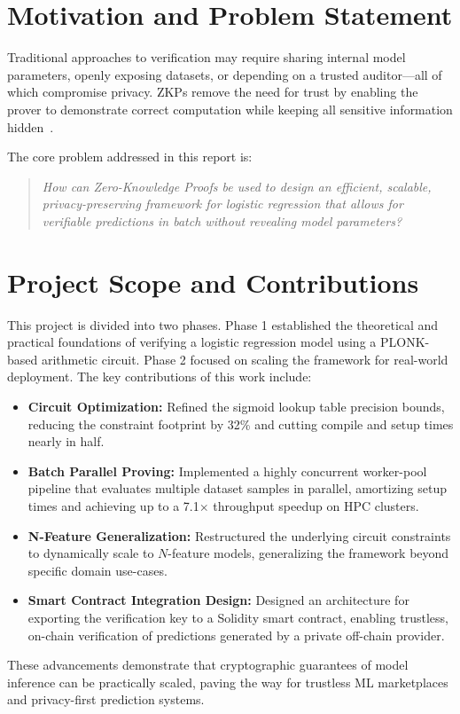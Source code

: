 \section{Motivation and Problem Statement}

Traditional approaches to verification may require sharing internal model parameters, openly exposing datasets, or depending on a trusted auditor---all of which compromise privacy. ZKPs remove the need for trust by enabling the prover to demonstrate correct computation while keeping all sensitive information hidden~\cite{kates2020plonk}.

The core problem addressed in this report is:
\begin{quote}
\textit{How can Zero-Knowledge Proofs be used to design an efficient, scalable, privacy-preserving framework for logistic regression that allows for verifiable predictions in batch without revealing model parameters?}
\end{quote}

\section{Project Scope and Contributions}

This project is divided into two phases. Phase 1 established the theoretical and practical foundations of verifying a logistic regression model using a PLONK-based arithmetic circuit. Phase 2 focused on scaling the framework for real-world deployment. The key contributions of this work include:
\begin{itemize}
    \item \textbf{Circuit Optimization:} Refined the sigmoid lookup table precision bounds, reducing the constraint footprint by 32\% and cutting compile and setup times nearly in half.
    \item \textbf{Batch Parallel Proving:} Implemented a highly concurrent worker-pool pipeline that evaluates multiple dataset samples in parallel, amortizing setup times and achieving up to a 7.1$\times$ throughput speedup on HPC clusters.
    \item \textbf{N-Feature Generalization:} Restructured the underlying circuit constraints to dynamically scale to $N$-feature models, generalizing the framework beyond specific domain use-cases.
    \item \textbf{Smart Contract Integration Design:} Designed an architecture for exporting the verification key to a Solidity smart contract, enabling trustless, on-chain verification of predictions generated by a private off-chain provider.
\end{itemize}

These advancements demonstrate that cryptographic guarantees of model inference can be practically scaled, paving the way for trustless ML marketplaces and privacy-first prediction systems.
